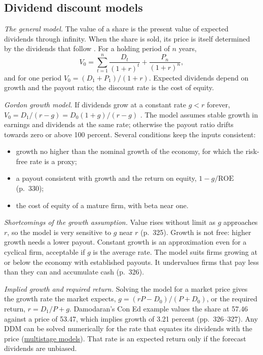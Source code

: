 \subsection{Dividend discount models}

\begin{qfmethod}\label{meth:gordon-growth-model}
 \emph{The general model.} The value of a share is the present value of expected dividends through infinity. When the share is sold, its price is itself determined by the dividends that follow \citep[p.~323]{investment-valuation-2012}. For a holding period of $n$ years,
\[ V_0=\sum_{t=1}^{n}\frac{D_t}{(1+r)^t}+\frac{P_n}{(1+r)^n}, \]
and for one period $V_0=(D_1+P_1)/(1+r)$. Expected dividends depend on growth and the payout ratio; the discount rate is the cost of equity.

\emph{Gordon growth model.} If dividends grow at a constant rate $g<r$ forever, $V_0=D_1/(r-g)=D_0(1+g)/(r-g)$ \citep[p.~324]{investment-valuation-2012}. The model assumes stable growth in earnings and dividends at the same rate; otherwise the payout ratio drifts towards zero or above 100 percent. Several conditions keep the inputs consistent:
\begin{itemize}
\item growth no higher than the nominal growth of the economy, for which the risk-free rate is a proxy;
\item a payout consistent with growth and the return on equity, $1-g/\mathrm{ROE}$ (p.~330);
\item the cost of equity of a mature firm, with beta near one.
\end{itemize}

\emph{Shortcomings of the growth assumption.} Value rises without limit as $g$ approaches $r$, so the model is very sensitive to $g$ near $r$ (p.~325). Growth is not free: higher growth needs a lower payout. Constant growth is an approximation even for a cyclical firm, acceptable if $g$ is the average rate. The model suits firms growing at or below the economy with established payouts. It undervalues firms that pay less than they can and accumulate cash (p.~326).

\emph{Implied growth and required return.} Solving the model for a market price gives the growth rate the market expects, $g=(rP-D_0)/(P+D_0)$, or the required return, $r=D_1/P+g$. Damodaran's Con Ed example values the share at 57.46 against a price of 53.47, which implies growth of 3.21 percent (pp.~326--327). Any DDM can be solved numerically for the rate that equates its dividends with the price (\hyperref[meth:multistage-ddm]{multistage models}). That rate is an expected return only if the forecast dividends are unbiased.


\end{qfmethod}
